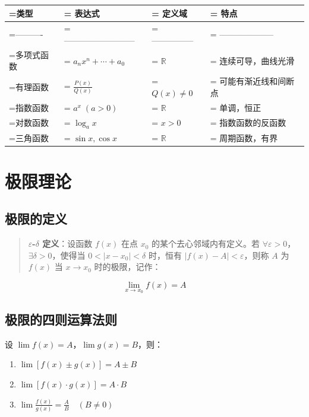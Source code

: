 \documentclass{harryopo-mathnotes}
\begin{document}
\begin{table}[htbp]
\centering
\begin{tabularx}{\textwidth}{>{\hsize=0.563\hsize\linewidth=\hsize}X>{\hsize=1.465\hsize\linewidth=\hsize}X>{\hsize=0.845\hsize\linewidth=\hsize}X>{\hsize=1.127\hsize\linewidth=\hsize}X}
\toprule
\textbf{类型} & \textbf{表达式} & \textbf{定义域} & \textbf{特点} \\
\midrule
---------- & -------------------------- & --------------- & -------------------- \\
多项式函数 & $a_n x^n + \cdots + a_0$ & $\mathbb{R}$ & 连续可导，曲线光滑 \\
有理函数 & $\frac{P(x)}{Q(x)}$ & $Q(x) \neq 0$ & 可能有渐近线和间断点 \\
指数函数 & $a^x \; (a > 0)$ & $\mathbb{R}$ & 单调，恒正 \\
对数函数 & $\log_a x$ & $x > 0$ & 指数函数的反函数 \\
三角函数 & $\sin x, \cos x$ & $\mathbb{R}$ & 周期函数，有界 \\
\bottomrule
\end{tabularx}
\end{table}

\section{极限理论}

\subsection{极限的定义}

\begin{quote}
\textbf{$\varepsilon$-$\delta$ 定义}：设函数 $f(x)$ 在点 $x_0$ 的某个去心邻域内有定义。若 $\forall \varepsilon > 0$，$\exists \delta > 0$，使得当 $0 < |x - x_0| < \delta$ 时，恒有 $|f(x) - A| < \varepsilon$，则称 $A$ 为 $f(x)$ 当 $x \to x_0$ 时的极限，记作：
\end{quote}

$$
\lim_{x \to x_0} f(x) = A
$$

\subsection{极限的四则运算法则}

设 $\lim f(x) = A$，$\lim g(x) = B$，则：

\begin{enumerate}
  \item $\lim [f(x) \pm g(x)] = A \pm B$
  \item $\lim [f(x) \cdot g(x)] = A \cdot B$
  \item $\lim \frac{f(x)}{g(x)} = \frac{A}{B} \quad (B \neq 0)$
\end{enumerate}
\end{document}
